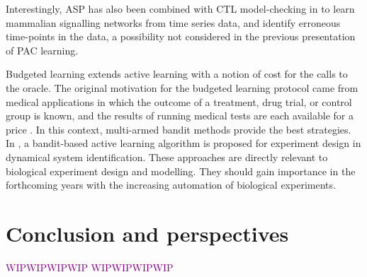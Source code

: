 \documentclass{llncs}
\newcommand{\wip}[1]{\textcolor{Purple}{WIPWIPWIPWIP #1 WIPWIPWIPWIP}}
\begin{document}
Interestingly, ASP has also been combined with CTL model-checking in \cite{OPSSG16biosystems} to learn mammalian signalling networks from time series data, 
and identify erroneous time-points in the data, a possibility not considered in the previous presentation of PAC learning.


Budgeted learning extends active learning with a notion of cost for the calls to the oracle.
The original motivation for the budgeted learning protocol came from medical applications in which the outcome of a treatment,
drug trial, or control group is known, and the results of running medical tests are each available for a price \cite{DZBSM13ml}.
In this context, multi-armed bandit methods \cite{DBSSZ07icdm} provide the best strategies.
In \cite{LMALS14ecml}, a bandit-based active learning algorithm is proposed for experiment design in dynamical system identification.
These approaches are directly relevant to biological experiment design and modelling. %
They should gain importance in the forthcoming years with the increasing automation of biological experiments.





\section{Conclusion and perspectives}
\wip{}



\end{document}
